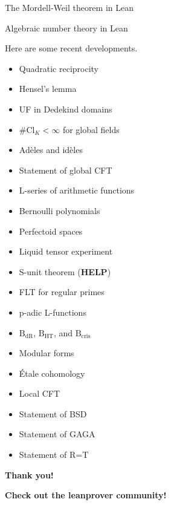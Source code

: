 \documentclass[10pt]{beamer}
\begin{document}
\begin{frame}[t]{The Mordell-Weil theorem in Lean}

\end{frame}

\begin{frame}[t]{Algebraic number theory in Lean}

Here are some recent developments.

\vspace{0.5cm}

\begin{minipage}{0.49\textwidth}
\begin{itemize}
\item<2-> Quadratic reciprocity
\item<2-> Hensel's lemma
\item<3-> UF in Dedekind domains
\item<3-> $ \#\mathrm{Cl}_K < \infty $ for global fields
\item<4-> Ad\`eles and id\`eles
\item<4-> Statement of global CFT
\item<5-> L-series of arithmetic functions
\item<5-> Bernoulli polynomials
\item<6-> Perfectoid spaces
\item<6-> Liquid tensor experiment
\end{itemize}
\end{minipage}
\begin{minipage}{0.49\textwidth}
\begin{itemize}
\item<7-> S-unit theorem (\textbf{HELP})
\item<7-> FLT for regular primes
\item<7-> p-adic L-functions
\item<7-> $ \mathrm{B}_{\mathrm{dR}} $, $ \mathrm{B}_{\mathrm{HT}} $, and $ \mathrm{B}_{\mathrm{cris}} $
\item<8-> Modular forms
\item<8-> \'Etale cohomology
\item<8-> Local CFT
\item<9> Statement of BSD
\item<9> Statement of GAGA
\item<9> Statement of R=T
\end{itemize}
\end{minipage}

\end{frame}

\begin{frame}

\begin{center}
\textbf{\Huge Thank you!}

\vspace{0.5cm}

\textbf{Check out the leanprover community!}
\end{center}

\end{frame}
\end{document}
